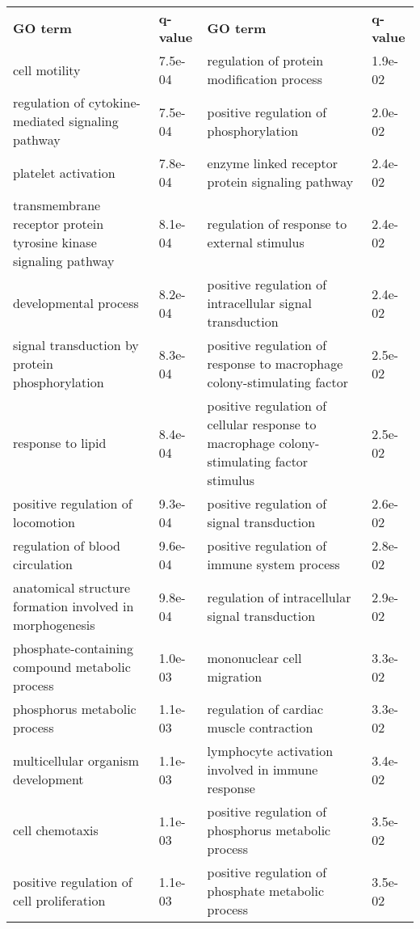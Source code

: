 \documentclass[fleqn,10pt]{SelfArx} %
\begin{document}
			
\begin{table}[!htb]
	\centering
	\scriptsize
	\begin{tabularx}{\textwidth}{XlXl}
		\rowcolor{NavyBlue!80}
		\textbf{\color{white} GO term} & \textbf{\color{white} q-value} & \textbf{\color{white} GO term} & \textbf{\color{white} q-value} \\
		cell motility & 7.5e-04 & regulation of protein modification process & 1.9e-02 \\ 
		regulation of cytokine-mediated signaling pathway & 7.5e-04 & positive regulation of phosphorylation & 2.0e-02 \\ 
		platelet activation & 7.8e-04 & enzyme linked receptor protein signaling pathway & 2.4e-02 \\ 
		transmembrane receptor protein tyrosine kinase signaling pathway & 8.1e-04 & regulation of response to external stimulus & 2.4e-02 \\ 
		developmental process & 8.2e-04 & positive regulation of intracellular signal transduction & 2.4e-02 \\ 
		signal transduction by protein phosphorylation & 8.3e-04 & positive regulation of response to macrophage colony-stimulating factor & 2.5e-02 \\ 
		response to lipid & 8.4e-04 & positive regulation of cellular response to macrophage colony-stimulating factor stimulus & 2.5e-02 \\ 
		positive regulation of locomotion & 9.3e-04 & positive regulation of signal transduction & 2.6e-02 \\ 
		regulation of blood circulation & 9.6e-04 & positive regulation of immune system process & 2.8e-02 \\ 
		anatomical structure formation involved in morphogenesis & 9.8e-04 & regulation of intracellular signal transduction & 2.9e-02 \\ 
		phosphate-containing compound metabolic process & 1.0e-03 & mononuclear cell migration & 3.3e-02 \\ 
		phosphorus metabolic process & 1.1e-03 & regulation of cardiac muscle contraction & 3.3e-02 \\ 
		multicellular organism development & 1.1e-03 & lymphocyte activation involved in immune response & 3.4e-02 \\ 
		cell chemotaxis & 1.1e-03 & positive regulation of phosphorus metabolic process & 3.5e-02 \\ 
		positive regulation of cell proliferation & 1.1e-03 & positive regulation of phosphate metabolic process & 3.5e-02 \\ 

\end{tabularx}
\end{table}
\end{document}
